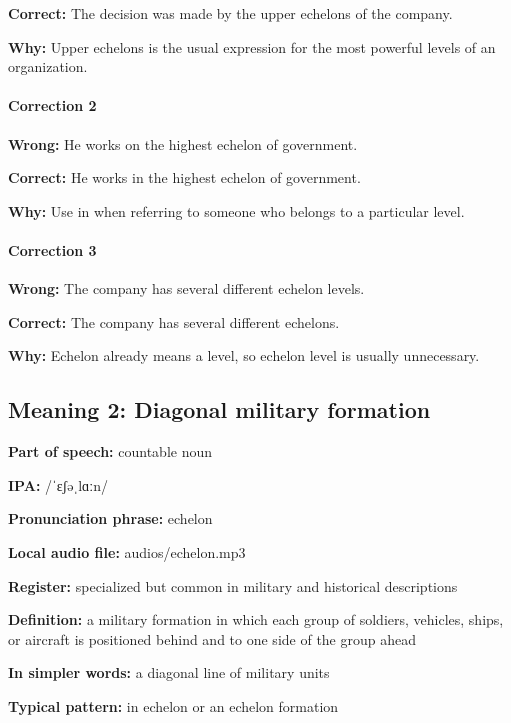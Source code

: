 \documentclass[11pt]{article}
\begin{document}
\textbf{Correct:} The decision was made by the upper echelons of the company.

\textbf{Why:} Upper echelons is the usual expression for the most powerful levels of an organization.

\paragraph{Correction 2}
\textbf{Wrong:} He works on the highest echelon of government.

\textbf{Correct:} He works in the highest echelon of government.

\textbf{Why:} Use in when referring to someone who belongs to a particular level.

\paragraph{Correction 3}
\textbf{Wrong:} The company has several different echelon levels.

\textbf{Correct:} The company has several different echelons.

\textbf{Why:} Echelon already means a level, so echelon level is usually unnecessary.

\subsection{Meaning 2: Diagonal military formation}
\textbf{Part of speech:} countable noun

\textbf{IPA:} /ˈɛʃəˌlɑːn/

\textbf{Pronunciation phrase:} echelon

\textbf{Local audio file:} audios/echelon.mp3

\textbf{Register:} specialized but common in military and historical descriptions

\textbf{Definition:} a military formation in which each group of soldiers, vehicles, ships, or aircraft is positioned behind and to one side of the group ahead

\textbf{In simpler words:} a diagonal line of military units

\textbf{Typical pattern:} in echelon or an echelon formation
\end{document}

